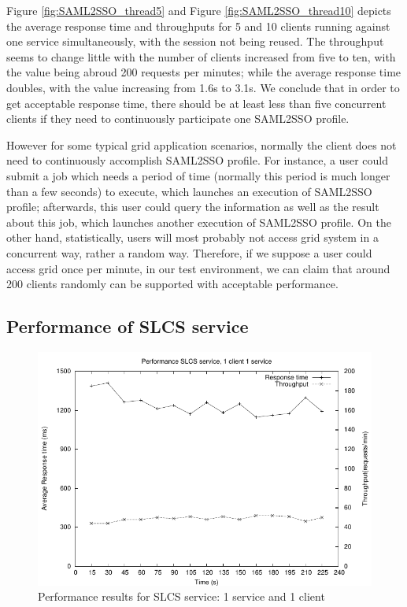 \documentclass[conference]{IEEEtran}
\begin{document}
Figure \ref{fig:SAML2SSO_thread5} and Figure \ref{fig:SAML2SSO_thread10} depicts the average 
response time and throughputs for 5 and 10 clients running against one service simultaneously,
with the session not being reused. The throughput seems to change little with the number of 
clients increased from five to ten, with the value being abroud 200 requests per minutes;
while the average response time doubles, with the value increasing from 1.6s to 3.1s. We conclude
that in order to get acceptable response time, there should be at least less than five concurrent
clients if they need to continuously participate one SAML2SSO profile. 

However for some typical grid application scenarios, normally the client does not need 
to continuously accomplish SAML2SSO profile. For instance, a user could submit a job 
which needs a period of time (normally this period is much longer than a few seconds)
to execute, which launches an execution of SAML2SSO profile; 
afterwards, this user could query the information as well as the result about this job, which 
launches another execution of SAML2SSO profile. On the other hand, statistically, users will most
probably not access grid system in a concurrent way, rather a random way. Therefore, if we 
suppose a user could access grid once per minute, in our test environment, we can claim that 
around 200 clients randomly can be supported with acceptable performance.


\subsection{Performance of SLCS service}
\label{sec:perfslcsserv}

\begin{figure}
\includegraphics[width=0.9\columnwidth]{SLCS.pdf}
\caption{Performance results for SLCS service: 1 service and 1 client}
\label{fig:SLCS}
\end{figure}
\end{document}
